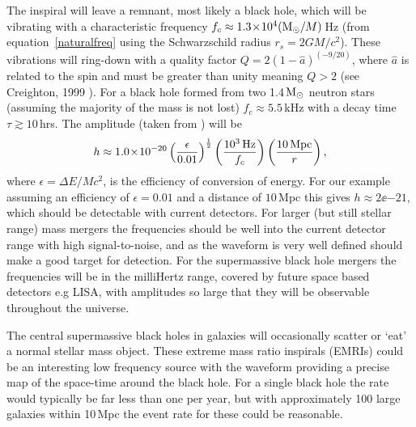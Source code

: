 The inspiral will leave a remnant, most likely a black hole, which will be vibrating with a
characteristic frequency $f_c \approx 1.3\!\times\!10^{4}({\rm M}_{\odot}/M)$\,Hz (from
equation~\ref{naturalfreq} using the Schwarzschild radius $r_s = 2GM/c^2$). These vibrations will
ring-down with a quality factor $Q = 2(1-\hat{a})^{(-9/20)}$, where $\hat{a}$ is related to the spin
and must be greater than unity meaning $Q > 2$ (see Creighton, 1999 \cite{Creighton:1999}). For a
black hole formed from two 1.4\,${\rm M}_{\odot}$ neutron stars (assuming the majority of the mass
is not lost) $f_c \approx 5.5$\,kHz with a decay time $\tau \gtrsim 10$\,hrs. The \gw amplitude
(taken from \cite{300Years}) will be
\begin{equation}
h \approx 1.0\!\times\!10^{-20}\left(\frac{\epsilon}{0.01}\right)^{\frac{1}{2}}\left(\frac{10^3\,{\rm
Hz}}{f_c}\right)\left(\frac{10\,{\rm Mpc}}{r}\right),
\end{equation}
where $\epsilon = \Delta{}E/Mc^2$, is the efficiency of conversion of energy. For our example
assuming an efficiency of $\epsilon = 0.01$ and a distance of $10$\,Mpc this gives $h \approx
2\ee{-21}$, which should be detectable with current detectors. For larger (but still stellar range)
mass mergers the frequencies should be well into the current detector range with high
signal-to-noise, and as the waveform is very well defined should make a good target for detection.
For the supermassive black hole mergers the frequencies will be in the milliHertz range, covered by
future space based detectors e.g LISA, with \gw amplitudes so large that they will be observable
throughout the universe.

The central supermassive black holes in galaxies will occasionally scatter or `eat' a normal stellar
mass object. These extreme mass ratio inspirals (EMRIs) could be an interesting low frequency \gw
source with the waveform providing a precise map of the space-time around the black hole. For a
single black hole the rate would typically be far less than one per year, but with approximately 100
large galaxies within 10\,Mpc the event rate for these could be reasonable.

